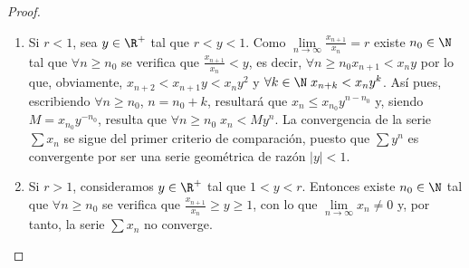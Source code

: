 \begin{proof}
	\begin{enumerate}
		\item Si \(r < 1\), sea \(y \in \R^{+}\) tal que \(r < y < 1\). Como \(\lim\limits_{n \to \infty} \frac{x_{n+1}}{x_n} = r \) existe \(n_0 \in \N \) tal que \(\forall n \geq  n_0\) se verifica que \(\frac{x_{n+1} }{x_n} < y\), es decir, \(\forall n \geq n_0 x_{n+1} < x_n y\) por lo que, obviamente, \(x_{n+2} < x_{n+1} y < x_n y^{2}\) y \(\forall k \in \N \; x_{n+k} < x_n y^{k} \). Así pues, escribiendo \(\forall n \geq n_0\), \(n = n_0 + k\), resultará que \(x_n \leq x_{n_0} y^{n -n_0}\) y, siendo \(M = x_{n_0} y^{-n_0}\), resulta que \(\forall n \geq n_0 \; x_n < M y^{n}\). La convergencia de la serie \(\sum x_n \) se sigue del primer criterio de comparación, puesto que \(\sum y^{n }	\) es convergente por ser una serie geométrica de razón \(\left\vert y  \right\vert < 1	\).
		\item Si \(r > 1 \), consideramos \(y \in \R^{+ }\) tal que \(1 < y < r\). Entonces existe \(n_0 \in \N \) tal que \(\forall n \geq n_0 \) se verifica que \(\frac{x_{n+1} }{x_n} \geq y \geq 1\), con lo que \(\lim\limits_{n \to \infty} x_n \neq 0\) y, por tanto, la serie \(\sum x_n \) no converge.   
	\end{enumerate}
\end{proof}

\vspace{0.3cm}
